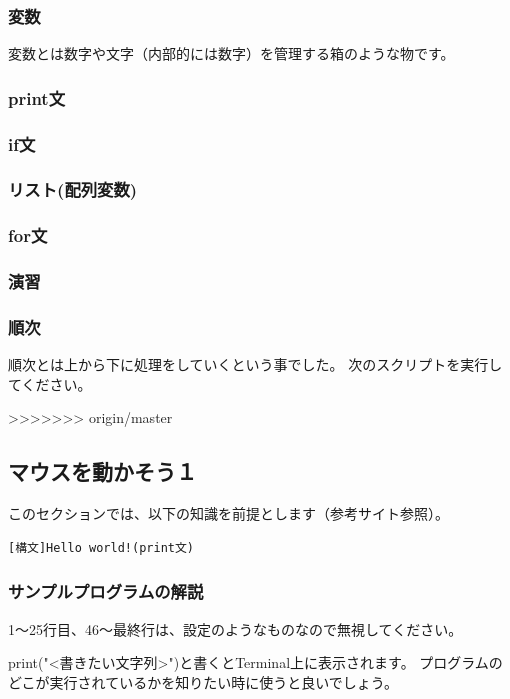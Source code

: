 \documentclass[11pt,a4paper]{jsarticle}
\begin{document}
\subsubsection{変数}
変数とは数字や文字（内部的には数字）を管理する箱のような物です。

\subsubsection{print文}
\subsubsection{if文}
\subsubsection{リスト(配列変数)}
\subsubsection{for文}
\subsubsection{演習}




\subsubsection{順次}
順次とは上から下に処理をしていくという事でした。
次のスクリプトを実行してください。


>>>>>>> origin/master

\newpage
\subsection{マウスを動かそう１}
このセクションでは、以下の知識を前提とします（参考サイト参照）。
\begin{lstlisting}[frame=single]
[構文]Hello world!(print文)
\end{lstlisting}

\subsubsection{サンプルプログラムの解説}
1〜25行目、46〜最終行は、設定のようなものなので無視してください。


print("<書きたい文字列>")と書くとTerminal上に表示されます。
プログラムのどこが実行されているかを知りたい時に使うと良いでしょう。
\end{document}
